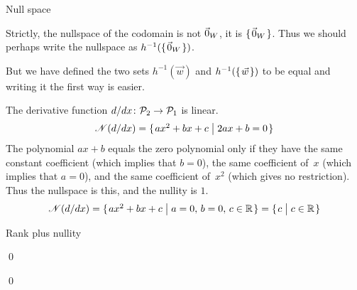 \documentclass[10pt,t,serif,professionalfont]{beamer}
\begin{document}
\begin{frame}{Null space}
\df[df:NullSpace]

\pause
\no 
Strictly, the nullspace of the codomain is not $\vec{0}_{W}$, it is 
$\mbox{$\{\hspace{0.1em}\vec{0}_{W}\hspace{0.1em}\}$}$.
Thus we should perhaps write the nullspace 
as $h^{-1}(\mbox{$\{\hspace{0.1em}\vec{0}_{W}\hspace{0.1em}\}$})$.

But we have defined the two sets $h^{-1}(\vec{w})$
and $h^{-1}(\mbox{$\{\hspace{0.1em}\vec{w}\hspace{0.1em}\}$})$ to be equal
and writing it the first way is easier.

\end{frame}




\begin{frame}
\ex
The derivative function $\mbox{$d/dx\colon \mathcal{P}_2\to \mathcal{P}_1$}$
is linear.
\begin{equation*}
  \mathscr{N}(d/dx)=\mbox{$\{\hspace{0.1em}ax^2+bx+c \bigm|
                                  2ax+b=0\hspace{0.1em}\}$}
\end{equation*}
The polynomial $ax+b$ equals the zero polynomial
only if they have the same constant coefficient (which implies that 
$b=0$), 
the same coefficient of~$x$ (which implies that $a=0$), and the same
coefficient of~$x^2$ (which gives no restriction).
Thus the nullspace is this, and the nullity is $1$. 
\begin{equation*}
  \mathscr{N}(d/dx)=\mbox{$\{\hspace{0.1em}ax^2+bx+c \bigm|
                                  a=0,\, b=0,\, c\in\mathbb{R}\hspace{0.1em}\}$}
                  =\mbox{$\{\hspace{0.1em}c\bigm| c\in\mathbb{R}\hspace{0.1em}\}$}
\end{equation*}

\end{frame}




\begin{frame}{Rank plus nullity}
\th[th:RankPlusNullEqDim]

\pause
\pf
{}

\pause
{}
\end{frame}
\begin{frame}
\qed
\end{frame}




\begin{frame}
\lm[lm:ImageLinearlyDependentIsLinearlyDependent]

\pause
\pf
{}
\qed
\end{frame}
\end{document}

